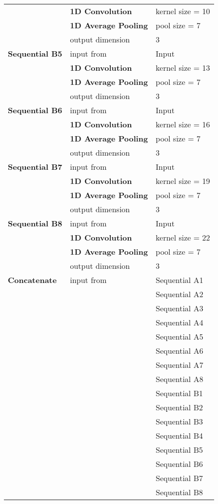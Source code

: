 \begin{appendices}
\begin{tabularx}{\textwidth}[!h]{X X X}
	& \textbf{1D Convolution} & kernel size = 10\\
	& \textbf{1D Average Pooling} & pool size = 7\\
	& output dimension & 3\\
	[8pt]
	\textbf{Sequential B5} & input from & Input\\
	& \textbf{1D Convolution} & kernel size = 13\\
	& \textbf{1D Average Pooling} & pool size = 7\\
	& output dimension & 3\\
	[8pt]
	\textbf{Sequential B6} & input from & Input\\
	& \textbf{1D Convolution} & kernel size = 16\\
	& \textbf{1D Average Pooling} & pool size = 7\\
	& output dimension & 3\\
	[8pt]
	\textbf{Sequential B7} & input from & Input\\
	& \textbf{1D Convolution} & kernel size = 19\\
	& \textbf{1D Average Pooling} & pool size = 7\\
	& output dimension & 3\\
	[8pt]
	\textbf{Sequential B8} & input from & Input\\
	& \textbf{1D Convolution} & kernel size = 22\\
	& \textbf{1D Average Pooling} & pool size = 7\\
	& output dimension & 3\\
	[8pt]
	\textbf{Concatenate} & input from & Sequential A1\\
	& & Sequential A2\\
	& & Sequential A3\\
	& & Sequential A4\\
	& & Sequential A5\\
	& & Sequential A6\\
	& & Sequential A7\\
	& & Sequential A8\\
	& & Sequential B1\\
	& & Sequential B2\\
	& & Sequential B3\\
	& & Sequential B4\\
	& & Sequential B5\\
	& & Sequential B6\\
	& & Sequential B7\\
	& & Sequential B8\\

\end{tabularx}
\end{appendices}
